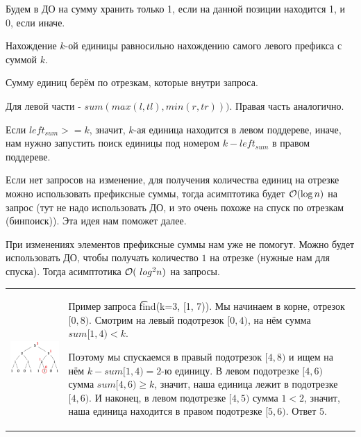 Будем в ДО на сумму хранить только 1, если на данной позиции находится 1, и 0, если иначе.
\down

Нахождение $k$-ой единицы равносильно нахождению самого левого префикса с суммой $k$.

Сумму единиц берём по отрезкам, которые внутри запроса.

Для левой части - $sum(max(l, tl), min(r, tr)))$. Правая часть аналогично.

Если $left_{sum} >= k$, значит, $k$-ая единица находится в левом поддереве, иначе, нам нужно запустить поиск единицы под номером $k - left_{sum}$ в правом поддереве.
\down

Если нет запросов на изменение, для получения количества единиц на отрезке можно использовать префиксные суммы, тогда асимптотика будет $\mathcal{O}(\log n)$ на запрос (тут не надо использовать ДО, и это очень похоже на спуск по отрезкам (бинпоиск)). Эта идея нам поможет далее.

При изменениях элементов префиксные суммы нам уже не помогут. Можно будет использовать ДО, чтобы получать количество $1$ на отрезке (нужные нам для спуска). Тогда асимптотика $\mathcal{O}(\ log ^ 2 n)$ на запросы. 


\begin{tabular}{cm{}}
	\begin{minipage}{4cm}
		\includegraphics[scale=0.5]{files/k-th.png}
	\end{minipage} 
	&
	Пример запроса \t{find(k=3, [1, 7))}. Мы начинаем в корне, отрезок $[0,8)$. Смотрим на левый подотрезок $[0, 4)$, на нём сумма $sum [1,4) < k$. 
	
	Поэтому мы спускаемся в правый подотрезок $[4,8)$ и ищем на нём $k-sum [1, 4) = 2$-ю единицу. В левом подотрезке $[4,6)$ сумма $sum [4, 6) \ge k$, значит, наша единица лежит в подотрезке $[4,6)$. И наконец, в левом подотрезке $[4,5)$ сумма $1 < 2$, значит, наша единица находится в правом подотрезке $[5,6)$. Ответ $5$.
\end{tabular}

